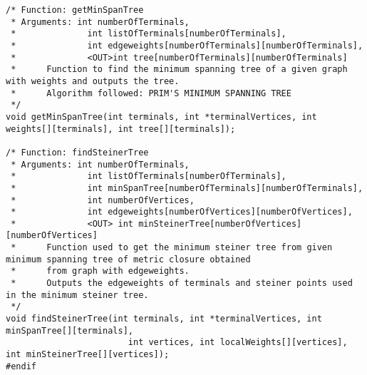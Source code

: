 \documentclass[a4paper]{article}
\begin{document}
\begin{lstlisting}
/* Function: getMinSpanTree
 * Arguments: int numberOfTerminals,
 *              int listOfTerminals[numberOfTerminals],
 *              int edgeweights[numberOfTerminals][numberOfTerminals],
 *              <OUT>int tree[numberOfTerminals][numberOfTerminals]
 *      Function to find the minimum spanning tree of a given graph with weights and outputs the tree.
 *      Algorithm followed: PRIM'S MINIMUM SPANNING TREE
 */
void getMinSpanTree(int terminals, int *terminalVertices, int weights[][terminals], int tree[][terminals]);

/* Function: findSteinerTree
 * Arguments: int numberOfTerminals,
 *              int listOfTerminals[numberOfTerminals],
 *              int minSpanTree[numberOfTerminals][numberOfTerminals],
 *              int numberOfVertices,
 *              int edgeweights[numberOfVertices][numberOfVertices],
 *              <OUT> int minSteinerTree[numberOfVertices][numberOfVertices]
 *      Function used to get the minimum steiner tree from given minimum spanning tree of metric closure obtained
 *      from graph with edgeweights.
 *      Outputs the edgeweights of terminals and steiner points used in the minimum steiner tree.
 */
void findSteinerTree(int terminals, int *terminalVertices, int minSpanTree[][terminals],
                        int vertices, int localWeights[][vertices], int minSteinerTree[][vertices]);
#endif
\end{lstlisting}
\end{document}
